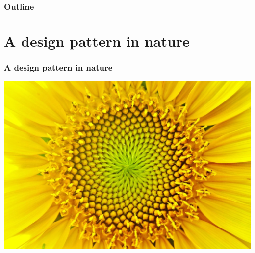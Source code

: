 \documentclass[12pt,compress,english,utf8,t]{beamer}
\begin{document}
\begin{frame}\frametitle{Outline}\tableofcontents\end{frame}


\section{A design pattern in nature}

\begin{frame}\frametitle{A design pattern in nature}
  \begin{center}
    \includegraphics[height=0.6\textheight]{sonnenblume2}
    \bigskip


\end{center}
\end{frame}
\end{document}
